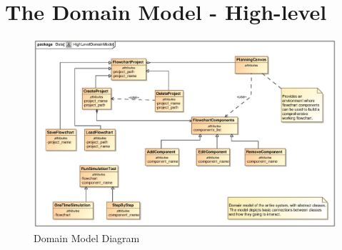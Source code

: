 \documentclass[12pt,a4paper,titlepage]{article}
\begin{document}
\newpage
\section{The Domain Model - High-level}
\begin{figure}[H]
  \centering
\includegraphics[width=500px]{HighLevelDomainModel.eps}
\caption{Domain Model Diagram}
\end{figure}

\newpage

\end{document}
